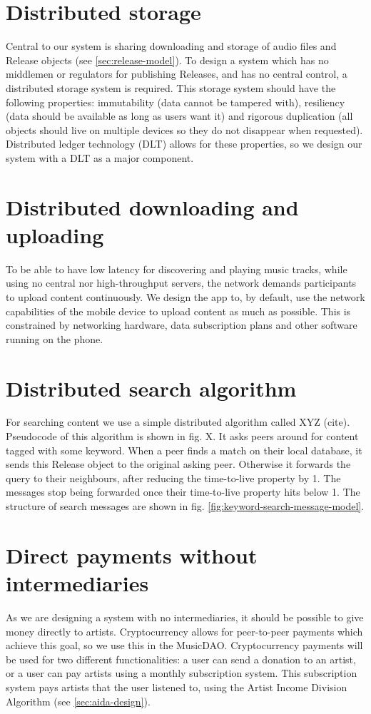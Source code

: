 \section{Distributed storage}
Central to our system is sharing downloading and storage of audio files and Release objects (see \ref{sec:release-model}). To design a system which has no middlemen or regulators for publishing Releases, and has no central control, a distributed storage system is required. This storage system should have the following properties: immutability (data cannot be tampered with), resiliency (data should be available as long as users want it) and rigorous duplication (all objects should live on multiple devices so they do not disappear when requested). Distributed ledger technology (DLT) allows for these properties, so we design our system with a DLT as a major component.

\section{Distributed downloading and uploading}
To be able to have low latency for discovering and playing music tracks, while using no central nor high-throughput servers, the network demands participants to upload content continuously. We design the app to, by default, use the network capabilities of the mobile device to upload content as much as possible. This is constrained by networking hardware, data subscription plans and other software running on the phone.

\section{Distributed search algorithm}
For searching content we use a simple distributed algorithm called XYZ (cite). Pseudocode of this algorithm is shown in fig. X. It asks peers around for content tagged with some keyword. When a peer finds a match on their local database, it sends this Release object to the original asking peer. Otherwise it forwards the query to their neighbours, after reducing the time-to-live property by 1. The messages stop being forwarded once their time-to-live property hits below 1. The structure of search messages are shown in fig. \ref{fig:keyword-search-message-model}.

\section{Direct payments without intermediaries}
As we are designing a system with no intermediaries, it should be possible to give money directly to artists. Cryptocurrency allows for peer-to-peer payments which achieve this goal, so we use this in the MusicDAO. Cryptocurrency payments will be used for two different functionalities: a user can send a donation to an artist, or a user can pay artists using a monthly subscription system. This subscription system pays artists that the user listened to, using the Artist Income Division Algorithm (see \ref{sec:aida-design}).

